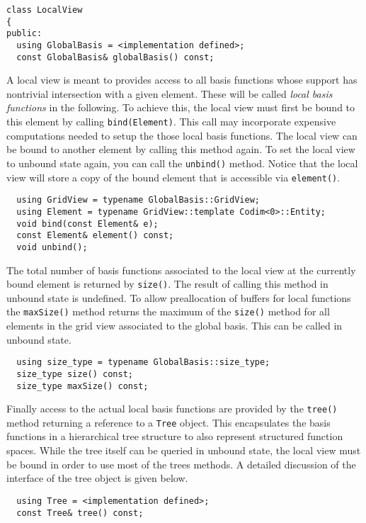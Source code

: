 \documentclass[a4paper,10pt,headings=normal,bibliography=totoc]{scrartcl}
\newcommand{\cpp}[1]{\lstinline[basicstyle=\ttfamily]!#1!}
\begin{document}
\begin{lstlisting}
class LocalView
{
public:
  using GlobalBasis = <implementation defined>;
  const GlobalBasis& globalBasis() const;
\end{lstlisting}

A local view is meant to provides access to all basis
functions whose support has nontrivial intersection with
a given element. These will be called \emph{local basis functions}
in the following. To achieve this, the local view must
first be bound to this element by calling \cpp{bind(Element)}.
This call may incorporate expensive computations needed to
setup the those local basis functions. The local view can be
bound to another element by calling this method again.
To set the local view to unbound state again, you
can call the \cpp{unbind()} method.
Notice that the local view will store a copy of the bound
element that is accessible via \cpp{element()}.

\begin{lstlisting}
  using GridView = typename GlobalBasis::GridView;
  using Element = typename GridView::template Codim<0>::Entity;
  void bind(const Element& e);
  const Element& element() const;
  void unbind();
\end{lstlisting}

The total number of basis functions associated to the
local view at the currently bound element is returned
by \cpp{size()}. The result of calling this method in
unbound state is undefined.
To allow preallocation of buffers for local functions
the \cpp{maxSize()} method returns the maximum of the
\cpp{size()} method for all elements in the grid view
associated to the global basis. This can be called in
unbound state.

\begin{lstlisting}
  using size_type = typename GlobalBasis::size_type;
  size_type size() const;
  size_type maxSize() const;
\end{lstlisting}

Finally access to the actual local basis functions are provided
by the \cpp{tree()} method returning a reference to a
\cpp{Tree} object. This encapsulates the basis functions
in a hierarchical tree structure to also represent structured
function spaces.
While the tree  itself can be queried in unbound state,
the local view must be bound in order to use most of the
trees methods.
A detailed discussion of the interface of the tree object is
given below.

\begin{lstlisting}
  using Tree = <implementation defined>;
  const Tree& tree() const;
\end{lstlisting}
\end{document}
